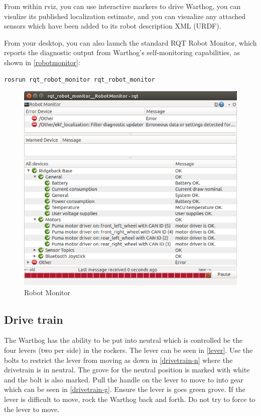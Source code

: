\documentclass[]{clearpath-latex/clearpath-manual}
\begin{document}
From within rviz, you can use interactive markers to drive Warthog, you can visulize its published localization estimate, and you can visualize any attached sensors which have been added to its robot description XML (URDF).

\pagebreak[4]

From your desktop, you can also launch the standard RQT Robot Monitor, which reports the diagnostic output from Warthog's self-monitoring capabilities, as shown in \autoref{robotmonitor}:

\begin{lstlisting}
rosrun rqt_robot_monitor rqt_robot_monitor
\end{lstlisting}

\begin{figure}[!htb]
  \centering
  \includegraphics[width=0.75\linewidth]{rqt_robot_monitor.png}
  \caption{Robot Monitor}
  \label{robotmonitor}
\end{figure}


\subsection{Drive train}

The Warthog has the ability to be put into neutral which is controlled be the four levers (two per side) in the rockers.  The lever can be seen in \autoref{lever}.  Use the bolts to restrict the lever from moving as down in \autoref{drivetrain-n} where the drivetrain is in neutral.  The grove for the neutral position is marked with white and the bolt is also marked.  Pull the handle on the lever to move to into gear which can be seen in \autoref{drivetrain-g}.  Ensure the lever is goes green grove.  If the lever is difficult to move, rock the Warthog back and forth.  Do not try to force to the lever to move.
\end{document}
